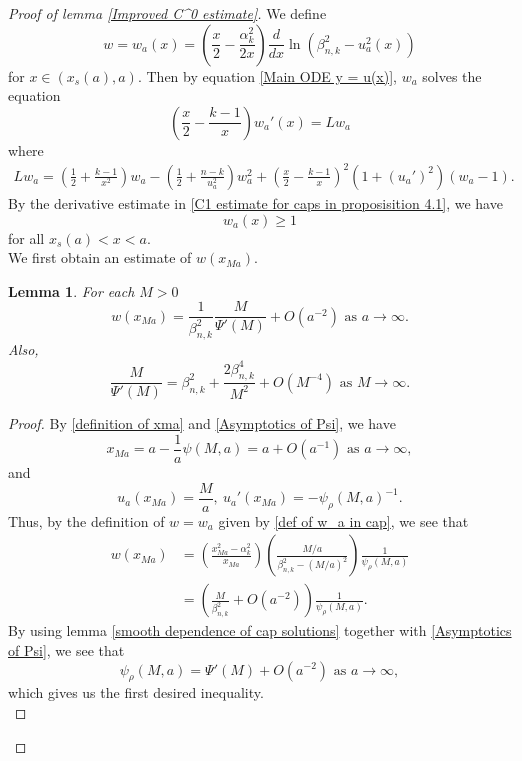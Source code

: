 \documentclass[pdflatex,sn-mathphys-num]{sn-jnl}
\newtheorem{lemma}[theorem]{Lemma}
\begin{document}
\begin{proof}[Proof of lemma \ref{Improved C^0 estimate}]
We define
\begin{equation}\label{def of w_a in cap}
    w = w_a(x) = (\frac{x}{2} - \frac{\alpha_k^2}{2x})\frac{d}{dx}\ln(\beta_{n,k}^2 - u_a^2(x))
\end{equation}
for $x \in (x_{s}(a), a)$. Then by equation \eqref{Main ODE y = u(x)}, $w_a$ solves the equation
\begin{equation}\label{ode for w in cap}
    (\frac{x}{2} - \frac{k-1}{x})w_a'(x) = Lw_a
\end{equation}
where
\begin{align*}
    Lw_a = (\frac{1}{2} + \frac{k-1}{x^2})w_a - (\frac{1}{2} + \frac{n-k}{u_a^2})w_a^2 + (\frac{x}{2} - \frac{k-1}{x})^2(1 + (u_a')^2)(w_a - 1).
\end{align*}
By the derivative estimate in \eqref{C1 estimate for caps in proposisition 4.1}, we have \begin{equation}
    w_{a}(x) \geq 1
\end{equation}for all $x_{s}(a) < x < a$.\\

We first obtain an estimate of $w(x_{Ma})$. 
\begin{lemma}\label{asymptotics for w in cap} For each $M > 0$
$$w(x_{Ma}) = \frac{1}{\beta_{n,k}^2}\frac{M}{\Psi'(M)} + O(a^{-2}) \text{ as }a \to \infty.$$
Also, 
$$\frac{M}{\Psi'(M)} = \beta_{n,k}^2 + \frac{2\beta_{n,k}^4}{M^2} + O(M^{-4}) \text{ as }M \to \infty.$$
\end{lemma}
\begin{proof}
  By \eqref{definition of xma} and \eqref{Asymptotics of Psi}, we have
  \begin{equation}
      x_{Ma} = a - \frac{1}{a}\psi(M,a) = a + O(a^{-1}) \text{ as }a \to \infty,
  \end{equation}
  and
  \begin{equation}
      u_a(x_{Ma}) = \frac{M}{a}, \ u_a'(x_{Ma}) = -\psi_{\rho}(M,a)^{-1}.
  \end{equation}
  Thus, by the definition of $w = w_a$ given by \eqref{def of w_a in cap}, we see that
  \begin{align*}
      w(x_{Ma}) & = (\frac{x_{Ma}^2 - \alpha_k^2}{x_{Ma}})(\frac{M/a}{\beta^2_{n,k} - (M/a)^2})\frac{1}{\psi_{\rho}(M,a)} \\ & = (\frac{M}{\beta^2_{n,k}}+ O(a^{-2}))\frac{1}{\psi_{\rho}(M,a)}.
  \end{align*}
  By using lemma \eqref{smooth dependence of cap solutions} together with \eqref{Asymptotics of Psi}, we see that
  \begin{equation}
      \psi_{\rho}(M,a) = \Psi'(M) + O(a^{-2}) \text{ as }a \to \infty,
  \end{equation}
  which gives us the first desired inequality. \\


\end{proof}
\end{proof}
\end{document}
